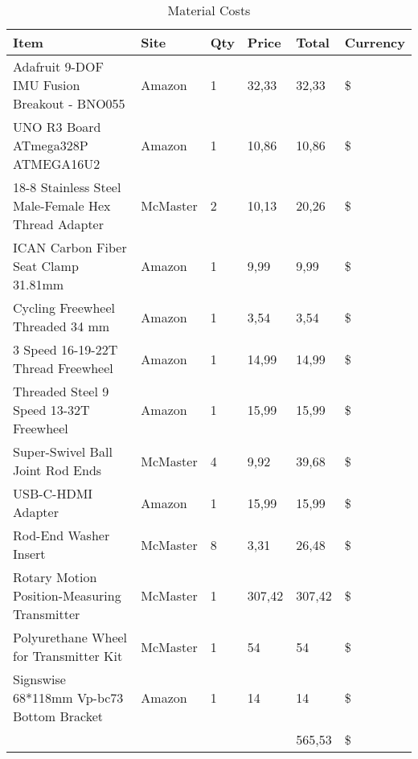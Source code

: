 \begin{table*}[hb]
\centering
\begin{tabular}{llll|ll}
\hline
\textbf{Item}                                                & \textbf{Site}     & \textbf{Qty} & \textbf{Price}  & \textbf{Total}  & \textbf{Currency} \\
\hline
Adafruit 9-DOF IMU Fusion Breakout - BNO055 					 & Amazon   & 1   & 32,33  & 32,33  & \$        \\
UNO R3 Board ATmega328P ATMEGA16U2             				     & Amazon   & 1   & 10,86  & 10,86  & \$        \\
18-8 Stainless Steel Male-Female Hex Thread Adapter              & McMaster & 2   & 10,13  & 20,26  & \$        \\
ICAN Carbon Fiber Seat Clamp 31.81mm                             & Amazon   & 1   & 9,99   & 9,99   & \$        \\
Cycling Freewheel Threaded 34 mm                                 & Amazon   & 1   & 3,54   & 3,54   & \$        \\
3 Speed 16-19-22T Thread Freewheel                               & Amazon   & 1   & 14,99  & 14,99  & \$        \\
Threaded Steel 9 Speed 13-32T Freewheel                          & Amazon   & 1   & 15,99  & 15,99  & \$        \\
Super-Swivel Ball Joint Rod Ends                                 & McMaster & 4   & 9,92   & 39,68  & \$        \\
USB-C-HDMI Adapter                                               & Amazon   & 1   & 15,99  & 15,99  & \$        \\
Rod-End Washer Insert                                            & McMaster & 8   & 3,31   & 26,48  & \$        \\
Rotary Motion Position-Measuring Transmitter                     & McMaster & 1   & 307,42 & 307,42 & \$        \\
Polyurethane Wheel for Transmitter Kit                           & McMaster & 1   & 54     & 54     & \$        \\
Signswise 68*118mm Vp-bc73 Bottom Bracket						 & Amazon   & 1   & 14     & 14     & \$        \\
\hline
                                                                 &          &     &        & 565,53 & \$       \\
\hline
\end{tabular}
\\[20pt]
\caption{Material Costs}
\end{table*}

